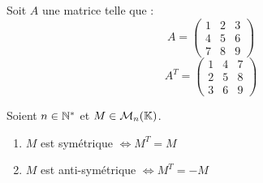 \begin{example}
	Soit $A$ une matrice telle que :
	\[ 
	A = 
	\begin{pmatrix}
	1 & 2 & 3 \\
	4 & 5 & 6 \\
	7 & 8 & 9
	\end{pmatrix}
	\]
	\[
	A^T =
	\begin{pmatrix}
	1 & 4 & 7 \\
	2 & 5 & 8 \\
	3 & 6 & 9
	\end{pmatrix}
	\]
\end{example}

\begin{definition}
	Soient $n \in \mathbb{N}^*$ et $M \in \mathcal{M}_n(\mathbb{K})$.
	    \begin{enumerate}
    		\item $M$ est symétrique $\iff M^T = M$
    		\item $M$ est anti-symétrique $\iff M^T = -M$
    	\end{enumerate}
\end{definition}

